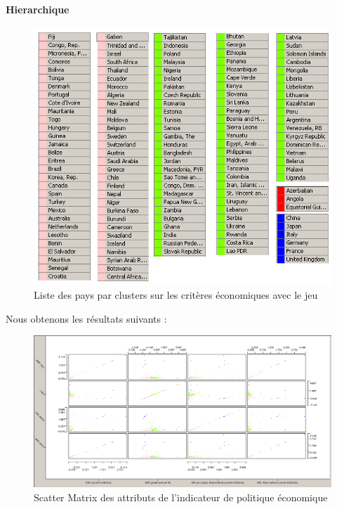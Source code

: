 \paragraph{Hierarchique}
\begin{figure}[H]
	\begin{center}
		\includegraphics[scale=0.5]{Image/TableViewPolitiqueNoMissing2}
		\caption{Liste des pays par clusters sur les critères économiques avec le jeu \jeuc}
	\end{center}
\end{figure}


Nous obtenons les résultats suivants : 

\begin{figure}[H]
	\begin{center}
		\includegraphics[scale=0.5]{Image/ScatterMatrixPolitiqueNoMissing2}
		\caption{Scatter Matrix des attributs de l'indicateur de politique économique \jeuc}
	\end{center}
\end{figure}

